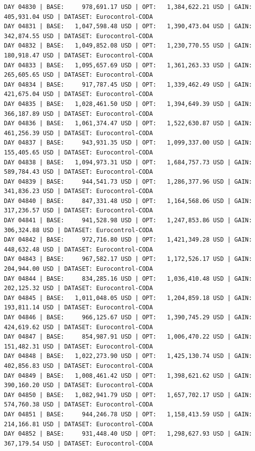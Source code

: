 \documentclass[11pt,a4paper]{article}
\begin{document}
\begin{verbatim}
DAY 04830 | BASE:     978,691.17 USD | OPT:   1,384,622.21 USD | GAIN: 405,931.04 USD | DATASET: Eurocontrol-CODA
DAY 04831 | BASE:   1,047,598.48 USD | OPT:   1,390,473.04 USD | GAIN: 342,874.55 USD | DATASET: Eurocontrol-CODA
DAY 04832 | BASE:   1,049,852.08 USD | OPT:   1,230,770.55 USD | GAIN: 180,918.47 USD | DATASET: Eurocontrol-CODA
DAY 04833 | BASE:   1,095,657.69 USD | OPT:   1,361,263.33 USD | GAIN: 265,605.65 USD | DATASET: Eurocontrol-CODA
DAY 04834 | BASE:     917,787.45 USD | OPT:   1,339,462.49 USD | GAIN: 421,675.04 USD | DATASET: Eurocontrol-CODA
DAY 04835 | BASE:   1,028,461.50 USD | OPT:   1,394,649.39 USD | GAIN: 366,187.89 USD | DATASET: Eurocontrol-CODA
DAY 04836 | BASE:   1,061,374.47 USD | OPT:   1,522,630.87 USD | GAIN: 461,256.39 USD | DATASET: Eurocontrol-CODA
DAY 04837 | BASE:     943,931.35 USD | OPT:   1,099,337.00 USD | GAIN: 155,405.65 USD | DATASET: Eurocontrol-CODA
DAY 04838 | BASE:   1,094,973.31 USD | OPT:   1,684,757.73 USD | GAIN: 589,784.43 USD | DATASET: Eurocontrol-CODA
DAY 04839 | BASE:     944,541.73 USD | OPT:   1,286,377.96 USD | GAIN: 341,836.23 USD | DATASET: Eurocontrol-CODA
DAY 04840 | BASE:     847,331.48 USD | OPT:   1,164,568.06 USD | GAIN: 317,236.57 USD | DATASET: Eurocontrol-CODA
DAY 04841 | BASE:     941,528.98 USD | OPT:   1,247,853.86 USD | GAIN: 306,324.88 USD | DATASET: Eurocontrol-CODA
DAY 04842 | BASE:     972,716.80 USD | OPT:   1,421,349.28 USD | GAIN: 448,632.48 USD | DATASET: Eurocontrol-CODA
DAY 04843 | BASE:     967,582.17 USD | OPT:   1,172,526.17 USD | GAIN: 204,944.00 USD | DATASET: Eurocontrol-CODA
DAY 04844 | BASE:     834,285.16 USD | OPT:   1,036,410.48 USD | GAIN: 202,125.32 USD | DATASET: Eurocontrol-CODA
DAY 04845 | BASE:   1,011,048.05 USD | OPT:   1,204,859.18 USD | GAIN: 193,811.14 USD | DATASET: Eurocontrol-CODA
DAY 04846 | BASE:     966,125.67 USD | OPT:   1,390,745.29 USD | GAIN: 424,619.62 USD | DATASET: Eurocontrol-CODA
DAY 04847 | BASE:     854,987.91 USD | OPT:   1,006,470.22 USD | GAIN: 151,482.31 USD | DATASET: Eurocontrol-CODA
DAY 04848 | BASE:   1,022,273.90 USD | OPT:   1,425,130.74 USD | GAIN: 402,856.83 USD | DATASET: Eurocontrol-CODA
DAY 04849 | BASE:   1,008,461.42 USD | OPT:   1,398,621.62 USD | GAIN: 390,160.20 USD | DATASET: Eurocontrol-CODA
DAY 04850 | BASE:   1,082,941.79 USD | OPT:   1,657,702.17 USD | GAIN: 574,760.38 USD | DATASET: Eurocontrol-CODA
DAY 04851 | BASE:     944,246.78 USD | OPT:   1,158,413.59 USD | GAIN: 214,166.81 USD | DATASET: Eurocontrol-CODA
DAY 04852 | BASE:     931,448.40 USD | OPT:   1,298,627.93 USD | GAIN: 367,179.54 USD | DATASET: Eurocontrol-CODA

\end{verbatim}
\end{document}

